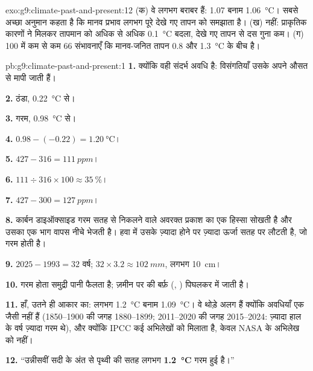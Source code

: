 \begin{solution}{exo:g9:climate-past-and-present:12}
(क) वे लगभग बराबर हैं: 1.07 बनाम \qty{1.06}{\degreeCelsius}। सबसे अच्छा
अनुमान कहता है कि मानव प्रभाव लगभग पूरे देखे गए तापन को समझाता है। (ख) नहीं:
प्राकृतिक कारणों ने मिलकर तापमान को अधिक से अधिक \qty{0.1}{\degreeCelsius} बदला,
देखे गए तापन से दस गुना कम। (ग) 100 में कम से कम 66 संभावनाएँ कि मानव-जनित
तापन 0.8 और \qty{1.3}{\degreeCelsius} के बीच है।
\end{solution}

\begin{solution}{pb:g9:climate-past-and-present:1}
\textbf{1.} क्योंकि वही संदर्भ अवधि है: विसंगतियाँ उसके अपने औसत से मापी जाती
हैं।

\textbf{2.} ठंडा, \qty{0.22}{\degreeCelsius} से।

\textbf{3.} गरम, \qty{0.98}{\degreeCelsius} से।

\textbf{4.} $0.98 - (-0.22) = \qty{1.20}{\degreeCelsius}$।

\textbf{5.} $427 - 316 = \qty{111}{ppm}$।

\textbf{6.} $111 \div 316 \times 100 \approx 35~\%$।

\textbf{7.} $427 - 300 = \qty{127}{ppm}$।

\textbf{8.} कार्बन डाइऑक्साइड गरम सतह से निकलने वाले अवरक्त प्रकाश का एक हिस्सा सोखती
है और उसका एक भाग वापस नीचे भेजती है। हवा में उसके ज़्यादा होने पर ज़्यादा ऊर्जा सतह पर
लौटती है, जो गरम होती है।

\textbf{9.} $2025 - 1993 = 32$ वर्ष; $32 \times 3.2 \approx
\qty{102}{mm}$, लगभग \qty{10}{cm}।

\textbf{10.} गरम होता समुद्री पानी फैलता है; ज़मीन पर की बर्फ़ (, )
पिघलकर  में जाती है।

\textbf{11.} हाँ, उतने ही आकार का: लगभग \qty{1.2}{\degreeCelsius} बनाम
\qty{1.09}{\degreeCelsius}। वे थोड़े अलग हैं क्योंकि अवधियाँ एक जैसी नहीं हैं
(1850--1900 की जगह 1880--1899; 2011--2020 की जगह 2015--2024: ज़्यादा हाल के वर्ष
ज़्यादा गरम थे), और क्योंकि IPCC कई अभिलेखों को मिलाता है, केवल NASA के अभिलेख को
नहीं।

\textbf{12.} ``उन्नीसवीं सदी के अंत से पृथ्वी की सतह लगभग
\textbf{\qty{1.2}{\degreeCelsius}} गरम हुई है।''
\end{solution}
